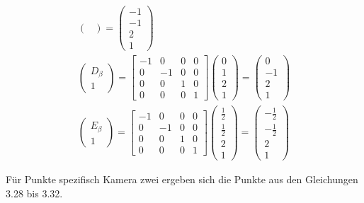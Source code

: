 \begin{gather}
\begin{pmatrix}
	\end{pmatrix}
	=
	\begin{pmatrix}
		-1\\-1\\2\\1
	\end{pmatrix}\\
	\begin{pmatrix}
		D_\beta\\1
	\end{pmatrix}
	=
	\begin{bmatrix}
		-1&0&0&0\\
		0&-1&0&0\\
		0&0&1&0\\
		0&0&0&1
	\end{bmatrix}
	\begin{pmatrix}
		0\\1\\2\\1
	\end{pmatrix}
	=
	\begin{pmatrix}
		0\\-1\\2\\1
	\end{pmatrix}\\
	\begin{pmatrix}
	E_\beta\\1
\end{pmatrix}
=
\begin{bmatrix}
	-1&0&0&0\\
	0&-1&0&0\\
	0&0&1&0\\
	0&0&0&1
\end{bmatrix}
\begin{pmatrix}
	\frac{1}{2}\\\frac{1}{2}\\2\\1
\end{pmatrix}
=
\begin{pmatrix}
	-\frac{1}{2}\\-\frac{1}{2}\\2\\1
\end{pmatrix}
\end{gather}

Für Punkte spezifisch Kamera zwei ergeben sich die Punkte aus den Gleichungen 3.28 bis 3.32.

